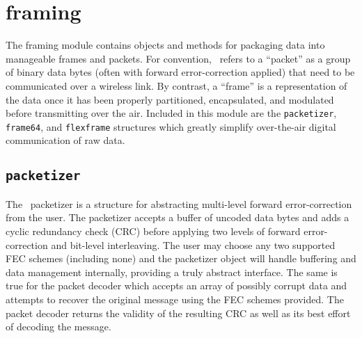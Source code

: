 % 
%

\newpage
\section{framing}
\label{module:framing}
The framing module contains objects and methods for packaging data into
manageable frames and packets.
For convention, \liquid\ refers to a ``packet'' as a group of binary
data bytes (often with forward error-correction applied)
that need to be communicated over a wireless link.
By contrast, a ``frame'' is a representation of the data once it has been
properly partitioned, encapsulated, and modulated before transmitting over the
air.
Included in this module are the {\tt packetizer}, 
{\tt frame64}, and {\tt flexframe} structures which
greatly simplify over-the-air digital communication of raw data.

%
%
\subsection{{\tt packetizer}}
\label{module:framing:packetizer}
The \liquid\ packetizer is a structure for abstracting multi-level forward
error-correction from the user.
The packetizer accepts a buffer of uncoded data bytes and adds a
cyclic redundancy check (CRC) before applying two levels of forward
error-correction and bit-level interleaving.
The user may choose any two supported FEC schemes (including none) and the
packetizer object will handle buffering and data management internally,
providing a truly abstract interface.
The same is true for the packet decoder which accepts an array
of possibly corrupt data and attempts to recover the original message using
the FEC schemes provided.
The packet decoder returns the validity of the resulting CRC as well as its
best effort of decoding the message.


